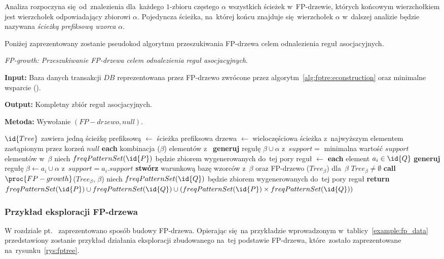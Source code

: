 Analiza rozpoczyna się~od~znalezienia dla~każdego $1$-zbioru częstego $\alpha$ wszystkich ścieżek w~FP-drzewie, których końcowym wierzchołkiem jest wierzchołek odpowiadający zbiorowi $\alpha$. Pojedyncza ścieżka, na~której końcu znajduje się~wierzchołek $\alpha$ w~dalszej analizie będzie nazywana \emph{ścieżką prefiksową wzorca} $\alpha$.

Poniżej zaprezentowany zostanie pseudokod algorytmu przeszukiwania FP-drzewa celem odnalezienia reguł asocjacyjnych.

\begin{alg}
	\emph{FP-growth: Przeszukiwanie FP-drzewa celem odnalezienia reguł asocjacyjnych}.

	\textbf{Input:} Baza danych transakcji $DB$ reprezentowana przez FP-drzewo zwrócone przez algorytm~\ref{alg:fptre:econstruction} oraz minimalne wsparcie ().

	\textbf{Output:} Kompletny zbiór reguł asocjacyjnych.

	\textbf{Metoda:} Wywołanie $(FP-drzewo, null)$.

	
\begin{codebox}
		\li \If $\id{Tree}$ zawiera jedną ścieżkę prefiksową
			\li \Then
				 $\gets$ ścieżka prefiksowa drzewa 
				\li {} $\gets$ wieloczęściowa ścieżka z~najwyższym elementem zastąpionym przez korzeń $null$
					\li \For \textbf{each} kombinacja ($\beta$) elementów z~
						\li \Do
							\textbf{generuj} regułę $\beta \cup \alpha$ z~$support =$ minimalna wartość $support$ elementów w~$\beta$
							\li niech $freqPatternSet(\id{P})$ będzie zbiorem wygenerowanych do~tej pory reguł
						\End
			\li \Else 
				 $\gets$ 
				\li \For \textbf{each} element $a_i \in \id{Q}$
					\li \Do
					\textbf{generuj} regułę $\beta \gets a_i \cup \alpha$ z~$support = a_i.support$
					\li \textbf{stwórz} warunkową bazę wzorców z~$\beta$ oraz FP-drzewo ($Tree_{\beta}$) dla~$\beta$
						\li	\If $Tree_{\beta} \neq \emptyset$
							\li \Then
							\textbf{call} $\proc{FP-growth}$($Tree_{\beta}$, $\beta$)
								\End
							\li niech $freqPatternSet(\id{Q})$ będzie zbiorem wygenerowanych do~tej pory reguł
						\End
				\End
		\li \textbf{return} $freqPatternSet(\id{P}) \cup freqPatternSet(\id{Q}) \cup (freqPatternSet(\id{P}) \times freqPatternSet(\id{Q}))$
		\End
\end{codebox}
\end{alg}

\subsubsection{Przykład eksploracji FP-drzewa}
W rozdziale pt.~\emph{} zaprezentowano sposób budowy FP-drzewa. Opierając się~na przykładzie wprowadzonym w~tablicy~\ref{example:fp_data} przedstawiony zostanie przykład działania eksploracji zbudowanego na~tej podstawie FP-drzewa, które~zostało zaprezentowane na~rysunku~\ref{rys:fptree}.

